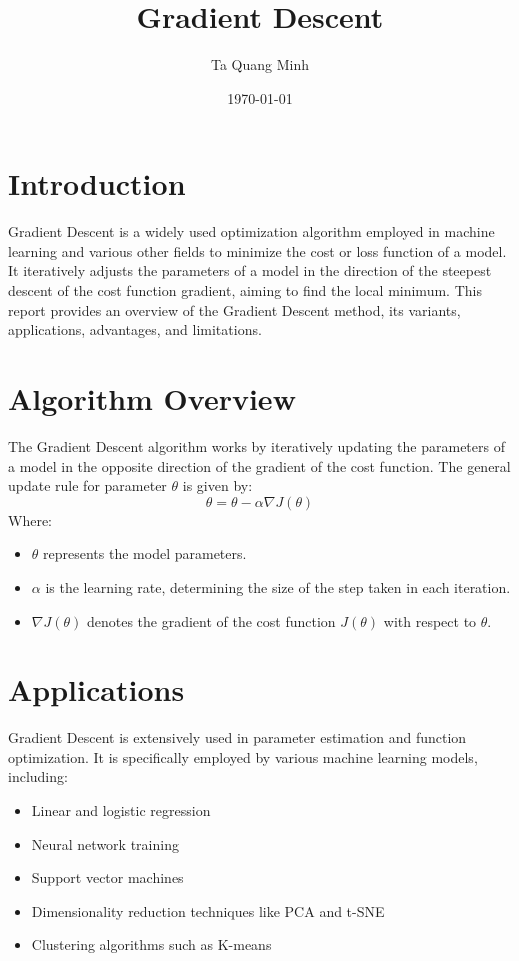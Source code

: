 \documentclass{article}
\begin{document}
\title{Gradient Descent}
\author{Ta Quang Minh}
\date{\today}
\maketitle

\section{Introduction}
Gradient Descent is a widely used optimization algorithm employed in machine learning and various other fields to minimize the cost or loss function of a model. It iteratively adjusts the parameters of a model in the direction of the steepest descent of the cost function gradient, aiming to find the local minimum. This report provides an overview of the Gradient Descent method, its variants, applications, advantages, and limitations.

\section{Algorithm Overview}
The Gradient Descent algorithm works by iteratively updating the parameters of a model in the opposite direction of the gradient of the cost function. The general update rule for parameter $\theta$ is given by:
\[
\theta = \theta - \alpha \nabla J(\theta)
\]
Where:
\begin{itemize}
    \item $\theta$ represents the model parameters.
    \item $\alpha$ is the learning rate, determining the size of the step taken in each iteration.
    \item $\nabla J(\theta)$ denotes the gradient of the cost function $J(\theta)$ with respect to $\theta$.
\end{itemize}

\section{Applications}
Gradient Descent is extensively used in parameter estimation and function optimization. It is specifically employed by various machine learning models, including:
\begin{itemize}
    \item Linear and logistic regression
    \item Neural network training
    \item Support vector machines
    \item Dimensionality reduction techniques like PCA and t-SNE
    \item Clustering algorithms such as K-means
\end{itemize}
\end{document}
